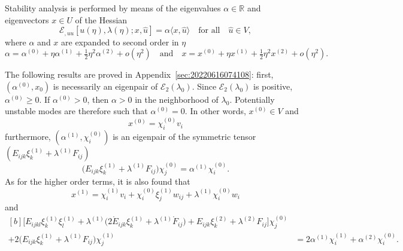 \documentclass[12pt, final]{scrartcl}
\theoremstyle{definition}
\newcommand{\E}{\mathcal E}
\newcommand{\order}[2][1]{#2^{(#1)}}
\newcommand{\reals}{\mathbb{R}}
\begin{document}
Stability analysis is performed by means of the eigenvalues $α \in \reals$ and
eigenvectors $x \in U$ of the Hessian
\begin{equation}
  \label{eq:20220617074949}
  \E_{, u u} [u(η), \lambda(η); x, \hat{u}] = α 〈 x, \hat{u} 〉 \quad \text{for all} \quad \hat{u} \in V,
\end{equation}
where $α$ and $x$ are expanded to second order in $η$
\begin{equation}
  \label{eq:20220617064633}
  α = \order[0]α + η \order[1]α + \tfrac{1}{2} η^2 \order[2]α + o(η^2)
  \quad \text{and} \quad
  x = \order[0]x + η \order[1]x + \tfrac{1}{2} η^2 \order[2]x + o(η^2).
\end{equation}

The following results are proved in Appendix~\ref{sec:20220616074108}: first,
$(\order[0]α, x_0)$ is necessarily an eigenpair of $\E_2(\lambda_0)$. Since $\E_2 (\lambda_0)$ is
positive, $\order[0]α ≥ 0$. If $\order[0]α>0$, then $α>0$ in the neighborhood of
$\lambda_0$. Potentially unstable modes are therefore such that $\order[0]α=0$. In other
words, $\order[0]x \in V$ and
\begin{equation}
  \label{eq:20220904160057}
  \order[0]x = \order[0]{χ_i} v_i
\end{equation}
furthermore, $(\order[1]α, \order[0]{χ_i})$ is an eigenpair of the symmetric
tensor $(E_{ijk} \order[1]{ξ_k} + \order[1]\lambda F_{ij})$
\begin{equation}
  \label{eq:20220609133608}
  \bigl(E_{ijk} \order[1]{ξ_k} + \order[1]\lambda F_{ij} \bigr) \order[0]{χ_j} = \order[1]α \order[0]{χ_i}.
\end{equation}
As for the higher order terms, it is also found that
\begin{equation}
  \label{eq:20220609133629}
  \order[1]x = \order[1]{χ_i} v_i +  \order[0]{χ_i} \order[1]{ξ_j} w_{i j} + \order[1]\lambda \order[0]{χ_i} w_i
\end{equation}
and
\begin{equation}
  \label{eq:20220616082923}
  \begin{aligned}[b]
    \bigl[E_{ijkl} \order[1]{ξ_k} \order[1]{ξ_l} + \order[1]\lambda\bigl(2 \mathring{E}_{ijk} \order[1]{ξ_k} + \order[1]\lambda \mathring{F}_{ij}\bigr) + E_{ijk} \order[2]{ξ_k}
    + \order[2]\lambda F_{ij} \bigr] \order[0]{χ_j} &\\
    + 2\bigl(E_{ijk}  \order[1]{ξ_k} + \order[1]\lambda F_{ij} \bigr) \order[1]{χ_j}
    & = 2\order[1]α\order[1]{χ_i} + \order[2]α \order[0]{χ_i}.
  \end{aligned}
\end{equation}
\end{document}

